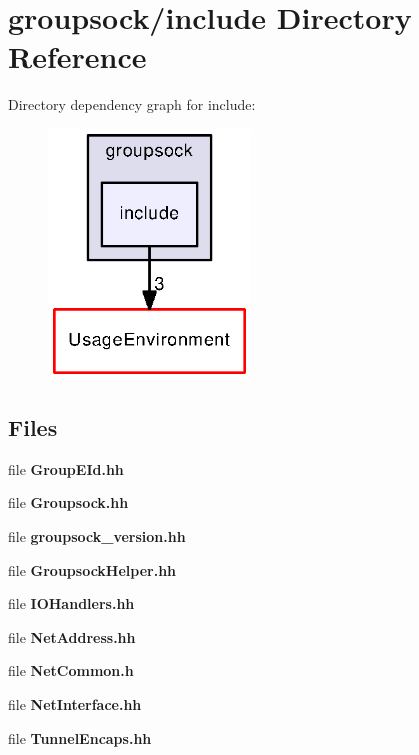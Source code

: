 \section{groupsock/include Directory Reference}
\label{dir_e04f4dd1132bded3b8e8d8a1c47f3e33}
Directory dependency graph for include\+:
\nopagebreak
\begin{figure}[H]
\begin{center}
\leavevmode
\includegraphics[width=152pt]{dir_e04f4dd1132bded3b8e8d8a1c47f3e33_dep}
\end{center}
\end{figure}
\subsection*{Files}
\begin{DoxyCompactItemize}
\item 
file {\bf Group\+E\+Id.\+hh}
\item 
file {\bf Groupsock.\+hh}
\item 
file {\bf groupsock\+\_\+version.\+hh}
\item 
file {\bf Groupsock\+Helper.\+hh}
\item 
file {\bf I\+O\+Handlers.\+hh}
\item 
file {\bf Net\+Address.\+hh}
\item 
file {\bf Net\+Common.\+h}
\item 
file {\bf Net\+Interface.\+hh}
\item 
file {\bf Tunnel\+Encaps.\+hh}
\end{DoxyCompactItemize}
